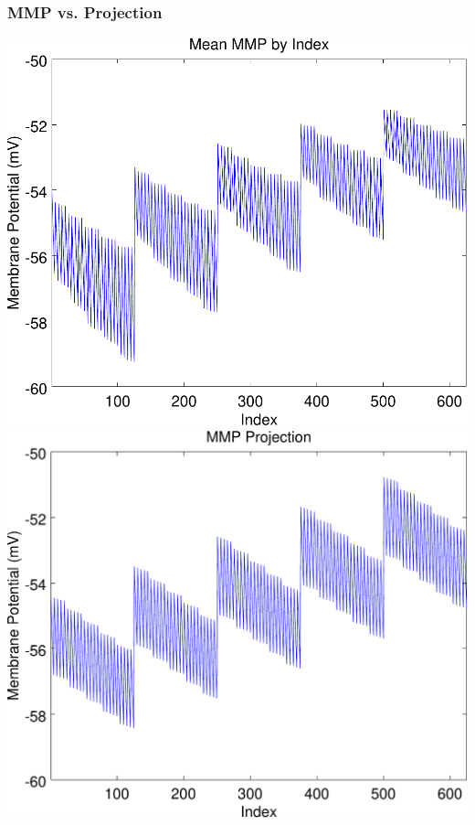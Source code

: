 \documentclass{beamer}
\theoremstyle{plain}
\theoremstyle{definition}
\begin{document}
\begin{frame}\frametitle{MMP vs. Projection}
  \begin{center}
    \includegraphics[scale=.32]{MMP.pdf}%
    \includegraphics[scale=.32]{MMPProjection.pdf}
  \end{center}
\end{frame}

\end{document}
